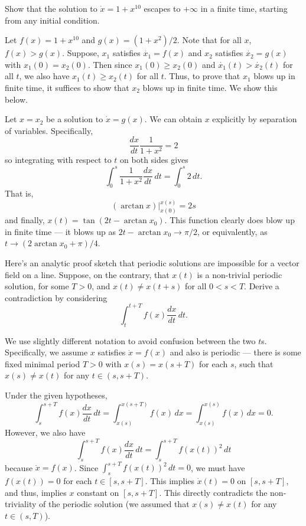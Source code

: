 \documentclass[12 pt, letterpaper]{hmcpset}
\begin{document}
\pagebreak

\begin{problem}[Strogatz 2.5.2]
	Show that the solution to $\dot{x} = 1 + x^{10}$ escapes to $+\infty$ in a finite time, starting from any initial condition.
\end{problem}

\begin{solution}
	Let $f(x) = 1 + x^{10}$ and $g(x) = (1 + x^{2}) / 2$. Note that for all $x$, $f(x) > g(x)$. Suppose, $x_{1}$ satisfies $\dot{x_{1}} = f(x)$ and $x_{2}$ satisfies $\dot{x_{2}} = g(x)$ with $x_{1}(0) = x_{2}(0)$. Then since $x_{1}(0) \ge x_{2}(0)$ and $\dot{x_{1}}(t) > \dot{x_{2}}(t)$ for all $t$, we also have $x_{1}(t) \ge x_{2}(t)$ for all $t$. Thus, to prove that $x_{1}$ blows up in finite time, it suffices to show that $x_{2}$ blows up in finite time. We show this below.

Let $x = x_{2}$ be a solution to $\dot{x} = g(x)$. We can obtain $x$ explicitly by separation of variables. Specifically,
\[
	\frac{d x}{d t} \frac{1}{1 + x^{2}} = 2
\]
so integrating with respect to $t$ on both sides gives
\[
	\int_{0}^{s} \frac{1}{1 + x^{2}} \frac{d x}{d t}  \, dt = \int_{0}^{s} 2 \, dt.
\]
That is,
\[
	(\arctan{x}) \Big |_{x(0)}^{x(s)} = 2s
\]
and finally, $x(t) = \tan{(2t - \arctan{x_{0}})}$. This function clearly does blow up in finite time --- it blows up as $2t - \arctan x_{0} \to \pi / 2$, or equivalently, as $t \to (2 \arctan{x_{0}} + \pi) / 4$.
\end{solution}

\pagebreak

\begin{problem}[Strogatz 2.6.2]
	Here's an analytic proof sketch that periodic solutions are impossible for a vector field on a line. Suppose, on the contrary, that $x(t)$ is a non-trivial periodic solution, for some $T > 0$, and $x(t) \neq x(t + s)$ for all $0 < s < T$. Derive a contradiction by considering
	\[
		\int_{t}^{t + T} f(x) \frac{d x}{d t} \, dt.
	\]
\end{problem}

\begin{solution}
	We use slightly different notation to avoid confusion between the two $t$s. Specifically, we assume $x$ satisfies $\dot{x} = f(x)$ and also is periodic --- there is some fixed minimal period $T > 0$ with $x(s) = x(s + T)$ for each $s$, such that  $x(s) \neq x(t)$ for any $t \in (s, s + T)$.

	Under the given hypotheses,
	\[
		\int_{s}^{s + T} f(x) \frac{d x}{d t} \, dt = \int_{x(s)}^{x(s + T)} f(x) \, dx = \int_{x(s)}^{x(s)} f(x) \, dx  = 0.
	\]
	However, we also have
	\[
		\int_{s}^{s + T} f(x) \frac{d x}{d t} \, dt = \int_{s}^{s + T} f(x(t))^{2} \, dt
	\]
	because $\dot{x} = f(x)$. Since $\int_{s}^{s + T} f(x(t))^{2} \, dt = 0$, we must have $f(x(t)) = 0$ for each $t \in [s, s + T]$. This implies $\dot{x}(t) = 0$ on $[s, s + T]$, and thus, implies $x$ constant on $[s, s + T]$. This directly contradicts the non-triviality of the periodic solution (we assumed that $x(s) \neq x(t)$ for any $t \in (s, T)$).
\end{solution}
\end{document}
